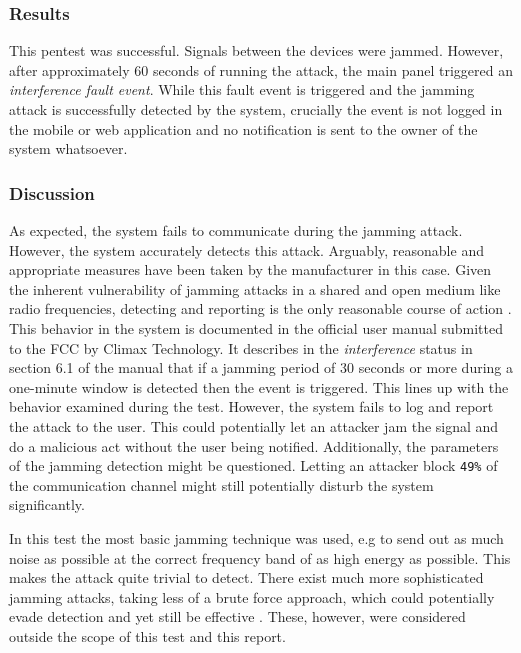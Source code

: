 \subsubsection{Results}
This pentest was successful. Signals between the devices were jammed. However, after approximately 60 seconds of running the attack, the main panel triggered an \textit{interference fault event}. While this fault event is triggered and the jamming attack is successfully detected by the system, crucially the event is not logged in the mobile or web application and no notification is sent to the owner of the system whatsoever.

\subsubsection{Discussion}
As expected, the system fails to communicate during the jamming attack. However, the system accurately detects this attack. Arguably, reasonable and appropriate measures have been taken by the manufacturer in this case. Given the inherent vulnerability of jamming attacks in a shared and open medium like radio frequencies, detecting and reporting is the only reasonable course of action 
\cite{optimal-jamming-defense}. This behavior in the system is documented in the official user manual submitted to the FCC \cite{hsgw-user-manual} by Climax Technology. It describes in the \textit{interference} status in section 6.1 of the manual that if a jamming period of 30 seconds or more during a one-minute window is detected then the event is triggered. This lines up with the behavior examined during the test. However, the system fails to log and report the attack to the user. This could potentially let an attacker jam the signal and do a malicious act without the user being notified. Additionally, the parameters of the jamming detection might be questioned. Letting an attacker block \texttt{49\%} of the communication channel might still potentially disturb the system significantly.

In this test the most basic jamming technique was used, e.g to send out as much noise as possible at the correct frequency band of as high energy as possible. This makes the attack quite trivial to detect. There exist much more sophisticated jamming attacks, taking less of a brute force approach, which could potentially evade detection and yet still be effective \cite{mpitziopoulos2009survey}. These, however, were considered outside the scope of this test and this report.
